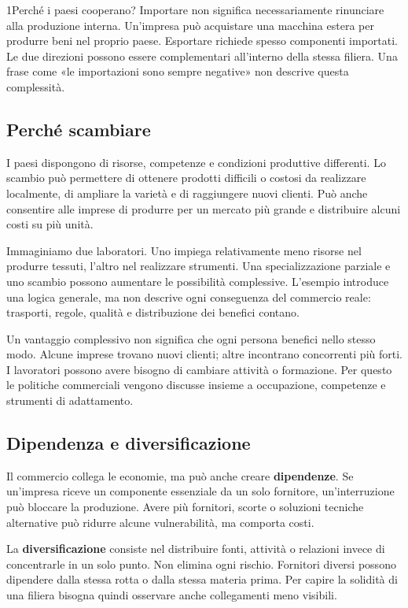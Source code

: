 \begin{lettura}{1}{Perché i paesi cooperano?}
Importare non significa necessariamente rinunciare alla produzione interna. Un'impresa può acquistare una macchina estera per produrre beni nel proprio paese. Esportare richiede spesso componenti importati. Le due direzioni possono essere complementari all'interno della stessa filiera. Una frase come «le importazioni sono sempre negative» non descrive questa complessità.

\subsection*{Perché scambiare}
I paesi dispongono di risorse, competenze e condizioni produttive differenti. Lo scambio può permettere di ottenere prodotti difficili o costosi da realizzare localmente, di ampliare la varietà e di raggiungere nuovi clienti. Può anche consentire alle imprese di produrre per un mercato più grande e distribuire alcuni costi su più unità.

Immaginiamo due laboratori. Uno impiega relativamente meno risorse nel produrre tessuti, l'altro nel realizzare strumenti. Una specializzazione parziale e uno scambio possono aumentare le possibilità complessive. L'esempio introduce una logica generale, ma non descrive ogni conseguenza del commercio reale: trasporti, regole, qualità e distribuzione dei benefici contano.

Un vantaggio complessivo non significa che ogni persona benefici nello stesso modo. Alcune imprese trovano nuovi clienti; altre incontrano concorrenti più forti. I lavoratori possono avere bisogno di cambiare attività o formazione. Per questo le politiche commerciali vengono discusse insieme a occupazione, competenze e strumenti di adattamento.

\subsection*{Dipendenza e diversificazione}
Il commercio collega le economie, ma può anche creare \textbf{dipendenze}. Se un'impresa riceve un componente essenziale da un solo fornitore, un'interruzione può bloccare la produzione. Avere più fornitori, scorte o soluzioni tecniche alternative può ridurre alcune vulnerabilità, ma comporta costi.

La \textbf{diversificazione} consiste nel distribuire fonti, attività o relazioni invece di concentrarle in un solo punto. Non elimina ogni rischio. Fornitori diversi possono dipendere dalla stessa rotta o dalla stessa materia prima. Per capire la solidità di una filiera bisogna quindi osservare anche collegamenti meno visibili.


\end{lettura}
